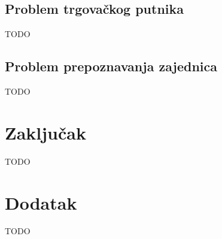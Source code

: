 \documentclass[a4paper]{article}
\begin{document}
\subsection{Problem trgovačkog putnika}
\label{sec:trgovacki_putnik}

TODO
















\subsection{Problem prepoznavanja zajednica}
\label{sec:prepoznavanje_zajednica}

TODO












\section{Zaključak}
\label{sec:zakljucak}

TODO

\appendix
 


\appendix
\section{Dodatak}
TODO
\end{document}
